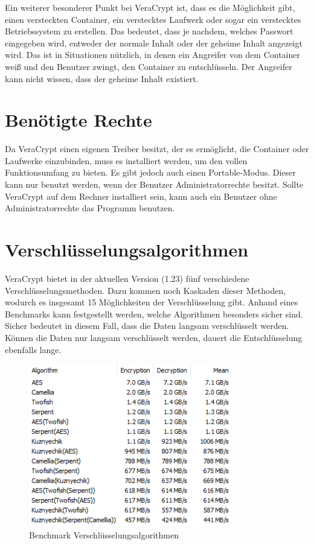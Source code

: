 \documentclass[12pt,a4paper]{scrreprt}
\begin{document}
\noindent Ein weiterer besonderer Punkt bei VeraCrypt ist, dass es die Möglichkeit gibt, einen versteckten Container, ein verstecktes Laufwerk oder sogar ein verstecktes Betriebssystem zu erstellen. Das bedeutet, dass je nachdem, welches Passwort eingegeben wird, entweder der normale Inhalt oder der geheime Inhalt angezeigt wird. Das ist in Situationen nützlich, in denen ein Angreifer von dem Container weiß und den Benutzer zwingt, den Container zu entschlüsseln. Der Angreifer kann nicht wissen, dass der geheime Inhalt existiert.

\section{Benötigte Rechte}
Da VeraCrypt einen eigenen Treiber besitzt, der es ermöglicht, die Container oder Laufwerke einzubinden, muss es installiert werden, um den vollen Funktionsumfang zu bieten. Es gibt jedoch auch einen Portable-Modus. Dieser kann nur benutzt werden, wenn der Benutzer Administratorrechte besitzt. Sollte VeraCrypt auf dem Rechner installiert sein, kann auch ein Benutzer ohne Administratorrechte das Programm benutzen.

\section{Verschlüsselungsalgorithmen}
VeraCrypt bietet in der aktuellen Version (1.23) fünf verschiedene Verschlüsselungsmethoden. Dazu kommen noch Kaskaden dieser Methoden, wodurch es insgesamt 15 Möglichkeiten der Verschlüsselung gibt. Anhand eines Benchmarks kann festgestellt werden, welche Algorithmen besonders sicher sind. Sicher bedeutet in diesem Fall, dass die Daten langsam verschlüsselt werden. Können die Daten nur langsam verschlüsselt werden, dauert die Entschlüsselung ebenfalls lange.\\

\begin{figure}[t]
\begin{center}
\includegraphics[width=250pt]{media/encryptionBenchmark.png}
\caption{Benchmark Verschlüsselungsalgorithmen}
\label{encbench}
\end{center}
\end{figure}
\end{document}
